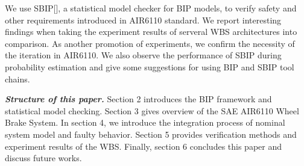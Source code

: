 We use SBIP[], a statistical model checker for BIP models, to verify safety and other requirements introduced in AIR6110 standard. We report interesting findings when taking the experiment results of serveral WBS architectures into comparison. As another promotion of experiments, we confirm the necessity of the iteration in AIR6110. We also observe the performance of SBIP during probability estimation and give some suggestions for using BIP and SBIP tool chains.

\textbf{\emph{Structure of this paper.}} Section 2 introduces the BIP framework and statistical model checking. Section 3 gives overview of the SAE AIR6110 Wheel Brake System. In section 4, we introduce the integration process of nominal system model and faulty behavior. Section 5 provides verification methods and experiment results of the WBS. Finally, section 6 concludes this paper and discuss future works.